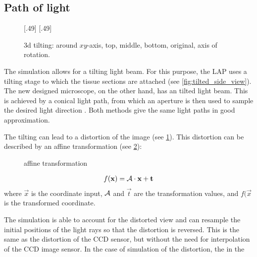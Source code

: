 \subsection{Path of light}
\label{sec:pathOfLight}
%
\begin{figure}[!t]
\setlength{\tikzheight}{0.42\textwidth}
[.49\textwidth]{
}\hfill
{}[.49\textwidth]{
}
\tikzset{external/export=false}
\caption[3d tilting]{3d tilting: around $xy$-axis, \raisebox{.25em}{\tikz \draw[red,thick](0,0)--(0.25,0);} top, \raisebox{.25em}{\tikz \draw[green,thick](0,0)--(0.25,0);} middle, \raisebox{.25em}{\tikz \draw[blue,thick](0,0)--(0.25,0);} bottom, \raisebox{.25em}{\tikz \draw[dash pattern=on 1.25pt off 1.25pt,thick](0,0)--(0.25,0);} original, \raisebox{.25em}{\tikz \draw[gray](0,0)--(0.25,0);} axis of rotation.}
\label{fig:tilting_camera_view}
\end{figure}
%
The simulation allows for a tilting light beam.
For this purpose, the \ac{LAP} uses a tilting stage to which the tissue sections are attached (see \cref{fig:tilted_side_view}).
The new designed microscope, on the other hand, has an tilted light beam.
This is achieved by a conical light path, from which an aperture is then used to sample the desired light direction \cite{Wiese:887678}.
Both methods give the same light paths in good approximation.
\par
%
The tilting can lead to a distortion of the image (see \cref{fig:tilting_camera_view}).
This distortion can be described by an affine transformation (see \cref{fig::affine_transformation}):
%
\begin{figure}[!t]
\centering

\caption{affine transformation}
\label{fig::affine_transformation}
\end{figure}
%
\begin{align}
f(\mathbf{x}) = \mathcal{A} \cdot \mathbf{x} + \mathbf{t}
\end{align}
where $\vec{x}$ is the coordinate input, $\mathcal{A}$ and $\vec{t}$ are the transformation values, and $f(\vec{x}$ is the transformed coordinate.
\par
%
The simulation is able to account for the distorted view and can resample the initial positions of the light rays so that the distortion is reversed.
This is the same as the distortion of the \ac{CCD} sensor, but without the need for interpolation of the \ac{CCD} image sensor.
In the case of simulation of the distortion, the in the 
